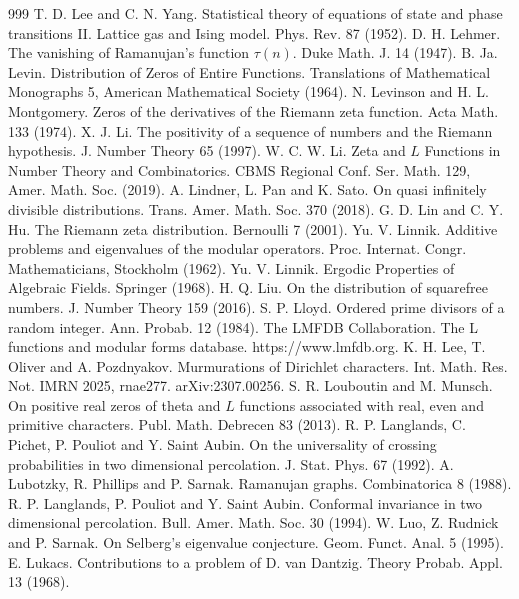 \begin{thebibliography}{999}
 T. D. Lee and C. N. Yang. Statistical theory of equations of state and phase transitions II. Lattice gas and Ising model. Phys. Rev. 87 (1952).
 D. H. Lehmer. The vanishing of Ramanujan's function $\tau(n)$. Duke Math. J. 14 (1947).
 B. Ja. Levin. Distribution of Zeros of Entire Functions. Translations of Mathematical Monographs 5, American Mathematical Society (1964).
 N. Levinson and H. L. Montgomery. Zeros of the derivatives of the Riemann zeta function. Acta Math. 133 (1974).
 X. J. Li. The positivity of a sequence of numbers and the Riemann hypothesis. J. Number Theory 65 (1997).
 W. C. W. Li. Zeta and $L$ Functions in Number Theory and Combinatorics. CBMS Regional Conf. Ser. Math. 129, Amer. Math. Soc. (2019).
 A. Lindner, L. Pan and K. Sato. On quasi infinitely divisible distributions. Trans. Amer. Math. Soc. 370 (2018).
 G. D. Lin and C. Y. Hu. The Riemann zeta distribution. Bernoulli 7 (2001).
 Yu. V. Linnik. Additive problems and eigenvalues of the modular operators. Proc. Internat. Congr. Mathematicians, Stockholm (1962).
 Yu. V. Linnik. Ergodic Properties of Algebraic Fields. Springer (1968).
 H. Q. Liu. On the distribution of squarefree numbers. J. Number Theory 159 (2016).
 S. P. Lloyd. Ordered prime divisors of a random integer. Ann. Probab. 12 (1984).
 The LMFDB Collaboration. The L functions and modular forms database. https://www.lmfdb.org.
 K. H. Lee, T. Oliver and A. Pozdnyakov. Murmurations of Dirichlet characters. Int. Math. Res. Not. IMRN 2025, rnae277. arXiv:2307.00256.
 S. R. Louboutin and M. Munsch. On positive real zeros of theta and $L$ functions associated with real, even and primitive characters. Publ. Math. Debrecen 83 (2013).
 R. P. Langlands, C. Pichet, P. Pouliot and Y. Saint Aubin. On the universality of crossing probabilities in two dimensional percolation. J. Stat. Phys. 67 (1992).
 A. Lubotzky, R. Phillips and P. Sarnak. Ramanujan graphs. Combinatorica 8 (1988).
 R. P. Langlands, P. Pouliot and Y. Saint Aubin. Conformal invariance in two dimensional percolation. Bull. Amer. Math. Soc. 30 (1994).
 W. Luo, Z. Rudnick and P. Sarnak. On Selberg's eigenvalue conjecture. Geom. Funct. Anal. 5 (1995).
 E. Lukacs. Contributions to a problem of D. van Dantzig. Theory Probab. Appl. 13 (1968).

\end{thebibliography}
